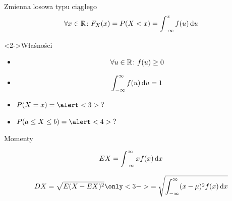\documentclass{mp}
\subtitle{Zmienne losowe typu ciągłego}
\renewcommand{\d}[1]{\ensuremath\,\text{d}#1}
\begin{document}
\frame{\titlepage}
\begin{frame}{Zmienna losowa typu ciągłego}
\[ \forall x\in\R\colon F_X(x)=P(X<x)=\int_{-\infty}^x f(u)\d{u} \]
\begin{block}<2->{Właśności}
\begin{itemize}
\item \[\forall u\in\mathbb{R}\colon f(u)\geq 0\]
\item \[\int_{-\infty}^\infty f(u)\d{u}=1\]
\end{itemize}
\end{block}
{
	\begin{itemize}
	\item<3-> $P(X=x)=\alert<3>{?}$
	\item<4-> $P(a\leq X\leq b)=\alert<4>{?}$
	\end{itemize}
}
\end{frame}
\begin{frame}{Momenty}
\begin{description}
\item[wartość średnia] \[ EX=\int_{-\infty}^\infty xf(x)\d{x} \]
\item<2->[odchylenie standardowe] \[ DX=\sqrt{E(X-EX)^2}\only<3->{=\sqrt{\int_{-\infty}^\infty (x-\mu)^2f(x)\d{x}}} \]
\end{description}
\end{frame}
\end{document}
